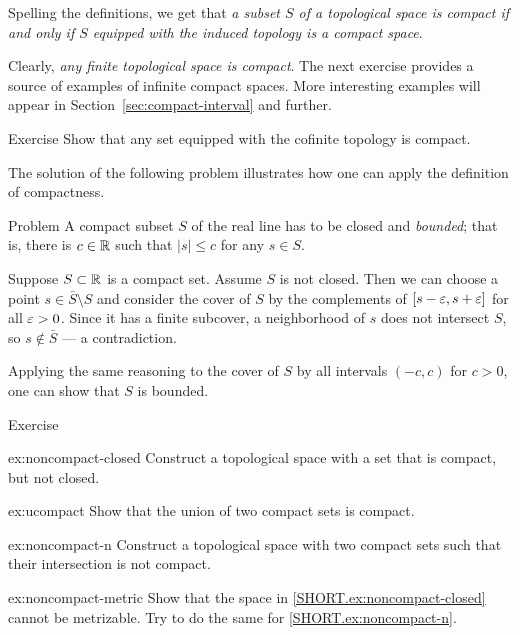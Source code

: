 Spelling the definitions, we get that \textit{a subset $S$ of a topological space is compact if and only if $S$ equipped with the induced topology is a compact space}.

Clearly, \textit{any finite topological space is compact}.
The next exercise provides a source of examples of infinite compact spaces.
More interesting examples will appear in Section~\ref{sec:compact-interval} and further.

\begin{thm}{Exercise}\label{ex:cofinite-compact}
Show that any set equipped with the cofinite topology is compact.
\end{thm}

The solution of the following problem illustrates how one can apply the definition of compactness.

\begin{thm}{Problem}\label{obs:closed-bounded}
A compact subset $S$ of the real line has to be closed and \emph{bounded}; that is, there is $c\in \mathbb{R}$ such that $|s|\le c$ for any $s\in S$.
\end{thm}

Suppose $S\subset \mathbb{R}$ is a compact set.
Assume $S$ is not closed.
Then we can choose a point $s\in\bar S\setminus S$ and consider the cover of $S$ by the complements of $[ s-\varepsilon,s+\varepsilon]$ for all $\varepsilon>0$.
Since it has a finite subcover, a neighborhood of $s$ does not intersect $S$, so $s\notin\bar S$ --- a contradiction.

Applying the same reasoning to the cover of $S$ by all intervals $(-c,c)$ for $c>0$, one can show that $S$ is bounded.
\qeds

\begin{thm}[!]{Exercise}\label{ex:noncompact-un}

\begin{subthm}{ex:noncompact-closed}
Construct a topological space with a set that is compact, but not closed.
\end{subthm}

\begin{subthm}{ex:ucompact}
Show that the union of two compact sets is compact.
\end{subthm}

\begin{subthm}{ex:noncompact-n}
Construct a topological space with two compact sets such that their intersection is not compact.
\end{subthm}

\begin{subthm}{ex:noncompact-metric}
Show that the space in \ref{SHORT.ex:noncompact-closed} cannot be metrizable.
Try to do the same for \ref{SHORT.ex:noncompact-n}.
\end{subthm}

\end{thm}




